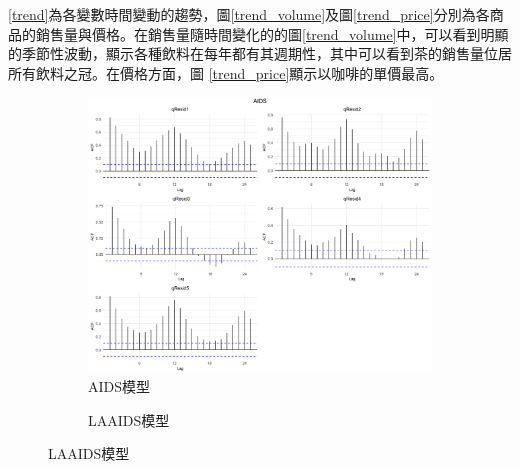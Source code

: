 \vspace{-3em}
\begin{singlespace}
        \begin{footnotesize}
        		 \ref{trend}為各變數時間變動的趨勢，圖\ref{trend_volume}及圖\ref{trend_price}分別為各商品的銷售量與價格。在銷售量隨時間變化的的圖\ref{trend_volume}中，可以看到明顯的季節性波動，顯示各種飲料在每年都有其週期性，其中可以看到茶的銷售量位居所有飲料之冠。在價格方面，圖 \ref{trend_price}顯示以咖啡的單價最高。
        \end{footnotesize}
\end{singlespace}


\begin{figure}[H]  %
	\begin{center}
	\caption{各變數殘差自相關檢定 (ACF) 分析} \label{ACF}
		\begin{subfigure}[b]{0.65\textwidth}
			 \caption{AIDS模型} \label{ACF_aids}
			\vspace{-0.85em}
			 \includegraphics[width=\textwidth]{../outcome/AIDS_plot_qResid.png}  %
		 \end{subfigure}
		 \begin{subfigure}[b]{0.65\textwidth}
			\caption{LAAIDS模型} \label{ACF_laaids}
			\vspace{-0.85em}

\end{subfigure}
\end{center}
\end{figure}
